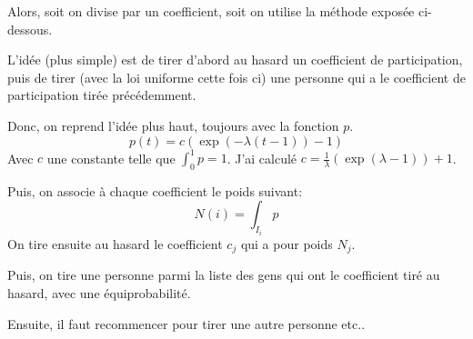 \documentclass[11pt, a4paper]{article}
\begin{document}
Alors, soit on divise par un coefficient, soit on utilise la méthode exposée ci-dessous.

L'idée (plus simple) est de tirer d'abord au hasard un coefficient de participation, puis de
tirer (avec la loi uniforme cette fois ci) une personne qui a le coefficient de participation tirée
précédemment.

Donc, on reprend l'idée plus haut, toujours avec la fonction $p$.
\[
    p(t) = c(\exp(-\lambda(t-1))-1)
    \]
Avec $c$ une constante telle que $\int_0^1 p = 1$. J'ai calculé $c = \frac{1}{\lambda}(\exp(\lambda
-1)) +1$.

Puis, on associe à chaque coefficient le poids suivant:
\[
    N(i)=\int_{I_i}p
    \]
On tire ensuite au hasard le coefficient $c_j$ qui a pour poids $N_j$.

Puis, on tire une personne parmi la liste des gens qui ont le coefficient tiré au hasard, avec une
équiprobabilité.

Ensuite, il faut recommencer pour tirer une autre personne etc..
\end{document}
